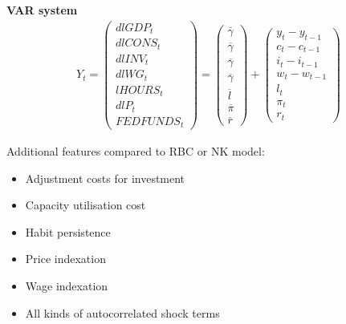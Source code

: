 \documentclass{beamer}
\begin{document}
\begin{frame}
 \textbf{VAR system}
\begin{align}
  Y_t = \begin{pmatrix}
    dlGDP_t \\ dlCONS_t \\ dlINV_t \\ dlWG_t \\ lHOURS_t \\ dlP_t \\ FEDFUNDS_t
  \end{pmatrix} =
  \begin{pmatrix}
    \overline{\gamma} \\ \overline{\gamma} \\ \overline{\gamma} \\ \overline{\gamma} \\ \overline{l} \\ \overline{\pi} \\ \overline{r}
  \end{pmatrix} +
  \begin{pmatrix}
    y_t-y_{t-1} \\c_t-c_{t-1} \\ i_t-i_{t-1} \\ w_t-w_{t-1} \\ l_t \\ \pi_t \\ r_t
  \end{pmatrix}  
\end{align}

\end{frame}

\begin{frame}
  Additional features compared to RBC or NK model:  
\begin{itemize}
  \item Adjustment costs for investment
  \item Capacity utilisation cost
  \item Habit persistence
  \item Price indexation
  \item Wage indexation
  \item All kinds of autocorrelated shock terms
\end{itemize}
\end{frame}
\end{document}
